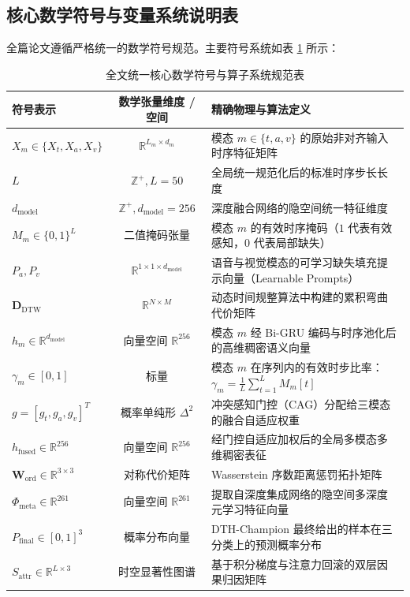\subsection{核心数学符号与变量系统说明表}
全篇论文遵循严格统一的数学符号规范。主要符号系统如表 \ref{tab:full_symbols} 所示：

\begin{table}[htp!]
\centering
\small
\renewcommand\arraystretch{1.3}
\caption{全文统一核心数学符号与算子系统规范表}
\label{tab:full_symbols}
\begin{tabularx}{\textwidth}{|l|c|X|}
\hline
\textbf{符号表示} & \textbf{数学张量维度 / 空间} & \textbf{精确物理与算法定义} \\ \hline
$X_m \in \{X_t, X_a, X_v\}$ & $\mathbb{R}^{L_m \times d_m}$ & 模态 $m \in \{t, a, v\}$ 的原始非对齐输入时序特征矩阵 \\ \hline
$L$ & $\mathbb{Z}^+, L=50$ & 全局统一规范化后的标准时序步长长度 \\ \hline
$d_{\text{model}}$ & $\mathbb{Z}^+, d_{\text{model}}=256$ & 深度融合网络的隐空间统一特征维度 \\ \hline
$M_m \in \{0, 1\}^{L}$ & 二值掩码张量 & 模态 $m$ 的有效时序掩码（$1$ 代表有效感知，$0$ 代表局部缺失） \\ \hline
$P_a, P_v$ & $\mathbb{R}^{1 \times 1 \times d_{\text{model}}}$ & 语音与视觉模态的可学习缺失填充提示向量（Learnable Prompts） \\ \hline
$\mathbf{D}_{\text{DTW}}$ & $\mathbb{R}^{N \times M}$ & 动态时间规整算法中构建的累积弯曲代价矩阵 \\ \hline
$h_m \in \mathbb{R}^{d_{\text{model}}}$ & 向量空间 $\mathbb{R}^{256}$ & 模态 $m$ 经 Bi-GRU 编码与时序池化后的高维稠密语义向量 \\ \hline
$\gamma_m \in [0, 1]$ & 标量 & 模态 $m$ 在序列内的有效时步比率：$\gamma_m = \frac{1}{L} \sum_{t=1}^L M_m[t]$ \\ \hline
$g = [g_t, g_a, g_v]^T$ & 概率单纯形 $\Delta^2$ & 冲突感知门控（CAG）分配给三模态的融合自适应权重 \\ \hline
$h_{\text{fused}} \in \mathbb{R}^{256}$ & 向量空间 $\mathbb{R}^{256}$ & 经门控自适应加权后的全局多模态多维稠密表征 \\ \hline
$\mathbf{W}_{\text{ord}} \in \mathbb{R}^{3 \times 3}$ & 对称代价矩阵 & Wasserstein 序数距离惩罚拓扑矩阵 \\ \hline
$\Phi_{\text{meta}} \in \mathbb{R}^{261}$ & 向量空间 $\mathbb{R}^{261}$ & 提取自深度集成网络的隐空间多深度元学习特征向量 \\ \hline
$P_{\text{final}} \in [0, 1]^3$ & 概率分布向量 & DTH-Champion 最终给出的样本在三分类上的预测概率分布 \\ \hline
$S_{\text{attr}} \in \mathbb{R}^{L \times 3}$ & 时空显著性图谱 & 基于积分梯度与注意力回滚的双层因果归因矩阵 \\ \hline
\end{tabularx}
\end{table}
